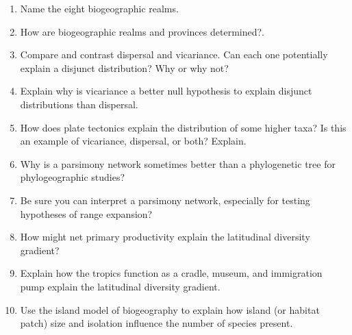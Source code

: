 \documentclass[letterpaper]{tufte-handout}
\begin{document}
\begin{enumerate}
	
	\item Name the eight biogeographic realms.
	
	\item How are biogeographic realms and provinces determined?.

	\item Compare and contrast dispersal and vicariance. Can each one potentially explain a disjunct distribution? Why or why not?  
	
	\item Explain why is vicariance a better null hypothesis to explain disjunct distributions than dispersal.
	
	\item How does plate tectonics explain the distribution of some higher taxa? Is this an example of vicariance, dispersal, or both? Explain.
	
	\item Why is a parsimony network sometimes better than a phylogenetic tree for phylogeographic studies? 
	
	\item Be sure you can interpret a parsimony network, especially for testing hypotheses of range expansion?
	
	\item How might net primary productivity explain the latitudinal diversity gradient?
	
	\item Explain how the tropics function as a cradle, museum, and immigration pump explain the latitudinal diversity gradient.
	
	\item Use the island model of biogeography to explain how island (or habitat patch) size and isolation influence the number of species present.

	
\end{enumerate}
\end{document}
